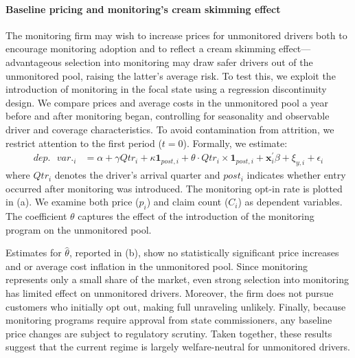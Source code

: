 \setcounter{figure}{0}
\setcounter{table}{0}

\paragraph{Baseline pricing and monitoring's cream skimming effect}

The monitoring firm may wish to increase prices for unmonitored drivers both to encourage monitoring adoption and to reflect a cream skimming effect---advantageous selection into monitoring may draw safer drivers out of the unmonitored pool, raising the latter's average risk. To test this, we exploit the introduction of monitoring in the focal state using a regression discontinuity design. We compare prices and average costs in the unmonitored pool a year before and after monitoring began, controlling for seasonality and observable driver and coverage characteristics. To avoid contamination from attrition, we restrict attention to the first period ($t = 0$). Formally, we estimate:
\begin{align}
dep.\text{ }var._{i} & =\alpha+\gamma Qtr_{i}+\kappa\mathbf{1}_{post,i}+\theta\cdot Qtr_{i}\times\mathbf{1}_{post,i}+\mathbf{x}_{i}^{\prime}\beta+\xi_{y,i}+\epsilon_{i}\label{eq:cs_claim}
\end{align}
where $Qtr_i$ denotes the driver's arrival quarter and $post_i$ indicates whether entry occurred after monitoring was introduced. The monitoring opt-in rate is plotted in (a). We examine both price ($p_i$) and claim count ($C_i$) as dependent variables. The coefficient $\theta$ captures the effect of the introduction of the monitoring program on the unmonitored pool.

Estimates for $\hat{\theta}$, reported in (b), show no statistically significant price increases and or average cost inflation in the unmonitored pool. Since monitoring represents only a small share of the market, even strong selection into monitoring has limited effect on unmonitored drivers. Moreover, the firm does not pursue customers who initially opt out, making full unraveling unlikely. Finally, because monitoring programs require approval from state commissioners, any baseline price changes are subject to regulatory scrutiny. Taken together, these results suggest that the current regime is largely welfare-neutral for unmonitored drivers.

